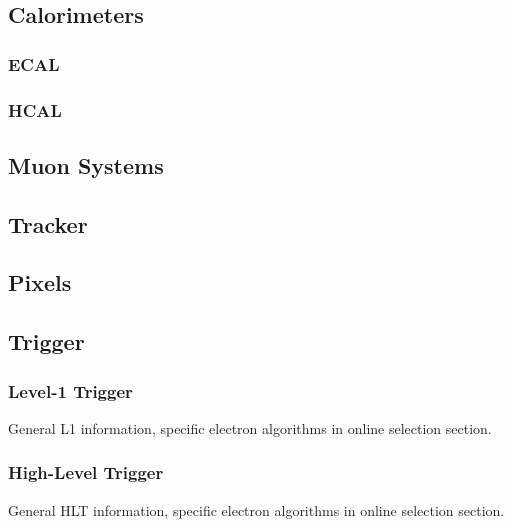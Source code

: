 \subsection{Calorimeters}
\subsubsection{ECAL}
\subsubsection{HCAL}
\subsection{Muon Systems}
\subsection{Tracker}
\subsection{Pixels}
\subsection{Trigger}
\subsubsection{Level-1 Trigger}
General L1 information, specific electron algorithms in online selection section.  
\subsubsection{High-Level Trigger}
General HLT information, specific electron algorithms in online selection section.  
